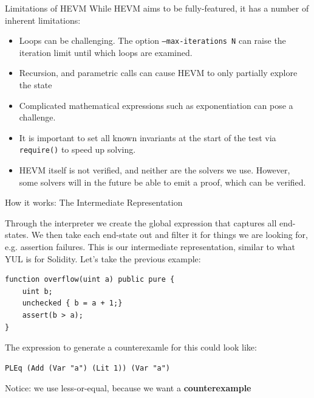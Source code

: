 \documentclass{beamer}
\begin{document}
\begin{frame}[fragile=singleslide]{Limitations of HEVM}
While HEVM aims to be fully-featured, it has a number of inherent limitations:

\begin{itemize}
\item Loops can be challenging. The option \texttt{--max-iterations N} can raise the iteration limit until which loops are examined.
\item Recursion, and parametric calls can cause HEVM to only partially explore the state
\item Complicated mathematical expressions such as exponentiation can pose a challenge.
\item It is important to set all known invariants at the start of the test via \texttt{require()} to speed up solving.
\item HEVM itself is not verified, and neither are the solvers we use. However, some solvers will in the future be able to emit a proof, which can be verified.
\end{itemize}
\end{frame}

\begin{frame}[fragile=singleslide]{How it works: The Intermediate Representation}
\small

Through the interpreter we create the global expression that captures all end-states. We then take each end-state out and filter it for things we are looking for, e.g. assertion failures. This is our intermediate representation, similar to what YUL is for Solidity. Let's take the previous example:


\begin{Verbatim}[frame=single, framerule=0.2mm,framesep=2mm,fontsize=\small]
function overflow(uint a) public pure {
	uint b;
	unchecked { b = a + 1;}
	assert(b > a);
}
\end{Verbatim}

The expression to generate a counterexamle for this could look like:

\begin{Verbatim}[frame=single, framerule=0.2mm, framesep=2mm,fontsize=\small]
PLEq (Add (Var "a") (Lit 1)) (Var "a")
\end{Verbatim}

Notice: we use less-or-equal, because we want a \textbf{counterexample}
\end{frame}
\end{document}
